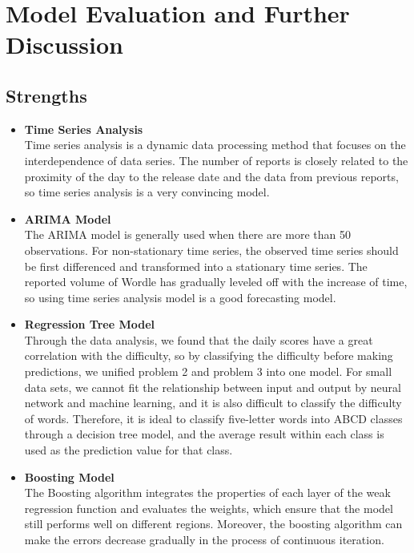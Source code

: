 \documentclass[12pt]{article}
\begin{document}


\section{Model Evaluation and Further Discussion}
\subsection{Strengths}
\begin{itemize}
    \item \textbf{Time Series Analysis}\\
    Time series analysis is a dynamic data processing method that focuses on the interdependence of data series.
    The number of reports is closely related to the proximity of the day to the release date and the data from previous reports, so time series analysis is a very convincing model.
    \item \textbf{ARIMA Model}\\
    The ARIMA model is generally used when there are more than 50 observations. For non-stationary time series, the observed time series should be first differenced and transformed into a stationary time series.  The reported volume of Wordle has gradually leveled off with the increase of time, so using time series analysis model is a good forecasting model.
    \item \textbf{Regression Tree Model}\\
    Through the data analysis, we found that the daily scores have a great correlation with the difficulty, so by classifying the difficulty before making predictions, we unified problem 2 and problem 3 into one model.
    For small data sets, we cannot fit the relationship between input and output by neural network and machine learning, and it is also difficult to classify the difficulty of words.
    Therefore, it is ideal to classify five-letter words into ABCD classes through a decision tree model, and the average result within each class is used as the prediction value for that class.
    \item \textbf{Boosting Model}\\
    The Boosting algorithm integrates the properties of each layer of the weak regression function and evaluates the weights, which ensure that the model still performs well on different regions. Moreover, the boosting algorithm can make the errors decrease gradually in the process of continuous iteration.
\end{itemize}
\end{document}
